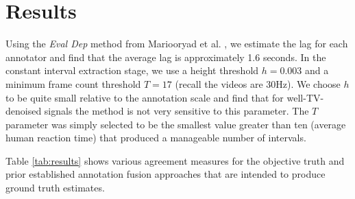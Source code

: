 \documentclass[10pt,letterpaper]{article}
\begin{document}
\section*{Results}
Using the \textit{Eval Dep} method from Mariooryad et al. \cite{Mariooryad2015}, we estimate the lag for each annotator and find that the average lag is approximately 1.6 seconds.  In the constant interval extraction stage, we use a height threshold $h=0.003$ and a minimum frame count threshold $T=17$ (recall the videos are 30Hz).  We choose $h$ to be quite small relative to the annotation scale and find that for well-TV-denoised signals the method is not very sensitive to this parameter.  The $T$ parameter was simply selected to be the smallest value greater than ten (average human reaction time) that produced a manageable number of intervals.

Table \ref{tab:results} shows various agreement measures for the objective truth and prior established annotation fusion approaches that are intended to produce ground truth estimates.
\end{document}
